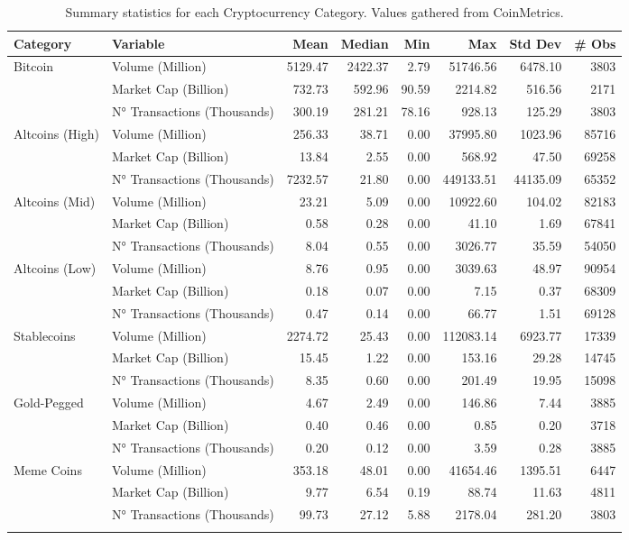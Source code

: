 \begin{table}[ht]
\centering
\scriptsize
\setlength{\tabcolsep}{4pt}
\begin{tabular}{llrrrrrr}
\toprule
Category & Variable & Mean & Median & Min & Max & Std Dev & \# Obs \\
\midrule
Bitcoin & Volume (Million) & 5129.47 & 2422.37 & 2.79 & 51746.56 & 6478.10 & 3803 \\
  & Market Cap (Billion) & 732.73 & 592.96 & 90.59 & 2214.82 & 516.56 & 2171 \\
  & N° Transactions (Thousands) & 300.19 & 281.21 & 78.16 & 928.13 & 125.29 & 3803 \\
\addlinespace
Altcoins (High) & Volume (Million) & 256.33 & 38.71 & 0.00 & 37995.80 & 1023.96 & 85716 \\
  & Market Cap (Billion) & 13.84 & 2.55 & 0.00 & 568.92 & 47.50 & 69258 \\
  & N° Transactions (Thousands) & 7232.57 & 21.80 & 0.00 & 449133.51 & 44135.09 & 65352 \\
\addlinespace
Altcoins (Mid) & Volume (Million) & 23.21 & 5.09 & 0.00 & 10922.60 & 104.02 & 82183 \\
  & Market Cap (Billion) & 0.58 & 0.28 & 0.00 & 41.10 & 1.69 & 67841 \\
  & N° Transactions (Thousands) & 8.04 & 0.55 & 0.00 & 3026.77 & 35.59 & 54050 \\
\addlinespace
Altcoins (Low) & Volume (Million) & 8.76 & 0.95 & 0.00 & 3039.63 & 48.97 & 90954 \\
  & Market Cap (Billion) & 0.18 & 0.07 & 0.00 & 7.15 & 0.37 & 68309 \\
  & N° Transactions (Thousands) & 0.47 & 0.14 & 0.00 & 66.77 & 1.51 & 69128 \\
\addlinespace
Stablecoins & Volume (Million) & 2274.72 & 25.43 & 0.00 & 112083.14 & 6923.77 & 17339 \\
  & Market Cap (Billion) & 15.45 & 1.22 & 0.00 & 153.16 & 29.28 & 14745 \\
  & N° Transactions (Thousands) & 8.35 & 0.60 & 0.00 & 201.49 & 19.95 & 15098 \\
\addlinespace
Gold-Pegged & Volume (Million) & 4.67 & 2.49 & 0.00 & 146.86 & 7.44 & 3885 \\
  & Market Cap (Billion) & 0.40 & 0.46 & 0.00 & 0.85 & 0.20 & 3718 \\
  & N° Transactions (Thousands) & 0.20 & 0.12 & 0.00 & 3.59 & 0.28 & 3885 \\
\addlinespace
Meme Coins & Volume (Million) & 353.18 & 48.01 & 0.00 & 41654.46 & 1395.51 & 6447 \\
  & Market Cap (Billion) & 9.77 & 6.54 & 0.19 & 88.74 & 11.63 & 4811 \\
  & N° Transactions (Thousands) & 99.73 & 27.12 & 5.88 & 2178.04 & 281.20 & 3803 \\
\addlinespace
\bottomrule
\end{tabular}
\caption{Summary statistics for each Cryptocurrency Category. Values gathered from CoinMetrics.}
\label{tab:crypto_complete_summary}
\end{table}
